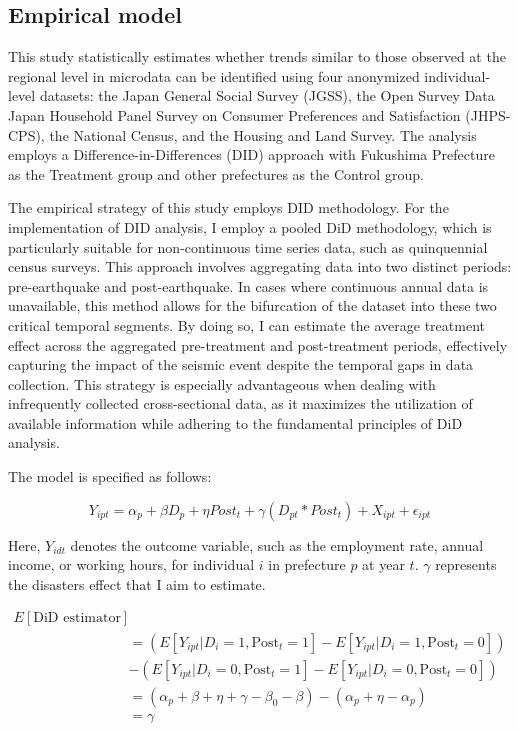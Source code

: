 \documentclass[a4paper,12pt]{article}
\begin{document}
\subsection{Empirical model}
\label{sec5.1}

This study statistically estimates whether trends similar to those observed at the regional level in microdata can be identified using four anonymized individual-level datasets: the Japan General Social Survey (JGSS), the Open Survey Data Japan Household Panel Survey on Consumer Preferences and Satisfaction (JHPS-CPS), the National Census, and the Housing and Land Survey. The analysis employs a Difference-in-Differences (DID) approach with Fukushima Prefecture as the Treatment group and other prefectures as the Control group.

The empirical strategy of this study employs DID methodology. For the implementation of DID analysis, I employ a pooled DiD methodology, which is particularly suitable for non-continuous time series data, such as quinquennial census surveys. This approach involves aggregating data into two distinct periods: pre-earthquake and post-earthquake. In cases where continuous annual data is unavailable, this method allows for the bifurcation of the dataset into these two critical temporal segments. By doing so, I can estimate the average treatment effect across the aggregated pre-treatment and post-treatment periods, effectively capturing the impact of the seismic event despite the temporal gaps in data collection. This strategy is especially advantageous when dealing with infrequently collected cross-sectional data, as it maximizes the utilization of available information while adhering to the fundamental principles of DiD analysis.

The model is specified as follows:

\begin{equation}
Y_{ipt} = \alpha_{p} + \beta D_{p} + \eta Post_{t} + \gamma (D_{pt} * Post_{t}) + X_{ipt} + \epsilon_{ipt}
\end{equation}

Here, \( Y_{idt} \) denotes the outcome variable, such as the employment rate, annual income, or working hours, for individual \( i \) in prefecture \( p \) at year \( t \). \( \gamma \) represents the disasters effect that I aim to estimate. 

\begin{equation}
\begin{aligned}
E[\text{DiD estimator}] \\
&= (E[Y_{ipt}|D_i = 1, \text{Post}_t = 1] - E[Y_{ipt}|D_i = 1, \text{Post}_t = 0]) \\
&- (E[Y_{ipt}|D_i = 0, \text{Post}_t = 1] - E[Y_{ipt}|D_i = 0, \text{Post}_t = 0]) \\
&= (\alpha_{p} + \beta + \eta + \gamma - \beta_0 - \beta) - (\alpha_{p} + \eta - \alpha_{p}) \\
&= \gamma
\end{aligned}
\end{equation}
\end{document}
